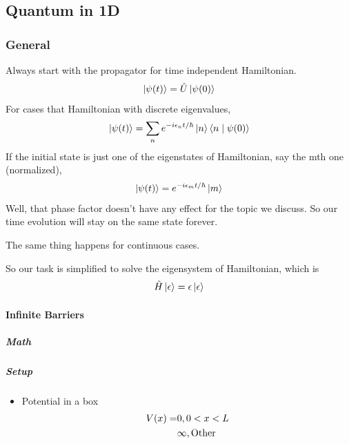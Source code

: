 \documentclass[letterpaper,10pt,english]{sphinxmanual}
\newcommand{\ket}[1]{\left| #1\right\rangle}
\newcommand{\braket}[2]{\langle #1 \mid #2 \rangle}
\begin{document}
\subsection{Quantum in 1D}
\label{Quantum/QuantumMechanics:quantum-in-1d}

\subsubsection{General}
\label{Quantum/QuantumMechanics:general}
Always start with the propagator for time independent Hamiltonian.
\begin{gather}
\begin{split}\ket{\psi(t)} = \hat U \ket{\psi(0)}\end{split}\notag
\end{gather}
For cases that Hamiltonian with discrete eigenvalues,
\begin{gather}
\begin{split}\ket{\psi(t)} = \sum _ n e^{-i \epsilon _ n t/ \hbar } \ket{n}\braket{n}{\psi(0)}\end{split}\notag
\end{gather}
If the initial state is just one of the eigenstates of Hamiltonian, say the mth one (normalized),
\begin{gather}
\begin{split}\ket{\psi(t)} = e^{- i \epsilon _ m t/\hbar} \ket{ m }\end{split}\notag
\end{gather}
Well, that phase factor doesn't have any effect for the topic we discuss. So our time evolution will stay on the same state forever.

The same thing happens for continuous cases.

So our task is simplified to solve the eigensystem of Hamiltonian, which is
\begin{gather}
\begin{split}\hat H \ket{\epsilon} = \epsilon \ket{\epsilon}\end{split}\notag
\end{gather}

\paragraph{Infinite Barriers}
\label{Quantum/QuantumMechanics:infinite-barriers}

\subparagraph{Math}
\label{Quantum/QuantumMechanics:math}

\subparagraph{Setup}
\label{Quantum/QuantumMechanics:setup}\begin{itemize}
\item {} 
Potential in a box
\begin{gather}
\begin{split}V(x) = & 0,  0< x <L \\
 & \infty, \text{Other}\end{split}\notag
\end{gather}
\end{itemize}
\end{document}
